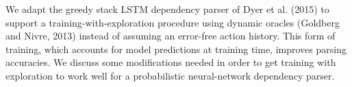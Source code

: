 We adapt the greedy stack LSTM dependency parser of Dyer et al. (2015) to support a training-with-exploration procedure using dynamic oracles (Goldberg and Nivre, 2013) instead of assuming an error-free action history. This form of training, which accounts for model predictions at training time, improves parsing accuracies. We discuss some modifications needed in order to get training with exploration to work well for a probabilistic neural-network dependency parser.
